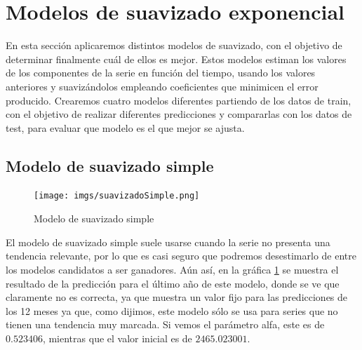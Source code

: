 \documentclass[a4paper,onecolumn]{extarticle}
\let\stdsection\section
\renewcommand\section{\newpage\stdsection}
\begin{document}
\begin{sloppypar}
\section{Modelos de suavizado exponencial} \label{suavizado}
En esta sección aplicaremos distintos modelos de suavizado, con el objetivo de determinar finalmente cuál de ellos es mejor. Estos modelos estiman los valores 
de los componentes de la serie en función del tiempo, usando los valores anteriores y suavizándolos empleando coeficientes que minimicen el error producido. 
Crearemos cuatro modelos diferentes partiendo de los datos de train, con el objetivo de realizar diferentes predicciones y compararlas con los datos de test, 
para evaluar que modelo es el que mejor se ajusta.

\subsection{Modelo de suavizado simple} \label{suavizadoSimple}
\begin{center}
    \begin{figure}[h!]
        \centering
        \texttt{[image: imgs/suavizadoSimple.png]}
        \caption{Modelo de suavizado simple} \label{fig:suavizadoSimple}
    \end{figure}
\end{center}
El modelo de suavizado simple suele usarse cuando la serie no presenta una tendencia relevante, por lo que es casi seguro que podremos desestimarlo de entre 
los modelos candidatos a ser ganadores. Aún así, en la gráfica \ref{fig:suavizadoSimple} se muestra el resultado de la predicción para el último año de este 
modelo, donde se ve que claramente no es correcta, ya que muestra un valor fijo para las predicciones de los 12 meses ya que, como dijimos, este modelo sólo 
se usa para series que no tienen una tendencia muy marcada. Si vemos el parámetro alfa, este es de $0.523406$, mientras que el valor inicial es de $2465.023001$.


\end{sloppypar}
\end{document}
